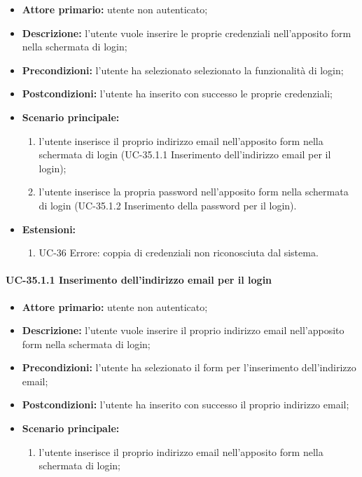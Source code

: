 	\begin{itemize}
		\item \textbf{Attore primario:} utente non autenticato;

		\item \textbf{Descrizione:} l'utente vuole inserire le proprie credenziali nell'apposito form nella schermata di login;

		\item \textbf{Precondizioni:} l'utente ha selezionato selezionato la funzionalità di login;

		\item \textbf{Postcondizioni:} l'utente ha inserito con successo le proprie credenziali;

		\item \textbf{Scenario principale:}
	  		\begin{enumerate}
		  		\item l'utente inserisce il proprio indirizzo email nell'apposito form nella schermata di login (UC-35.1.1 Inserimento dell'indirizzo email per il login); 
		  		\item l'utente inserisce la propria password nell'apposito form nella schermata di login (UC-35.1.2 Inserimento della password per il login).
	  		\end{enumerate}
	    \item \textbf{Estensioni:}
	  		\begin{enumerate}
		  		\item UC-36 Errore: coppia di credenziali non riconosciuta dal sistema.
	  		\end{enumerate}
	\end{itemize}


\paragraph{UC-35.1.1 Inserimento dell'indirizzo email per il login}

	\begin{itemize}
		\item \textbf{Attore primario:} utente non autenticato;

		\item \textbf{Descrizione:} l'utente vuole inserire il proprio indirizzo email nell'apposito form nella schermata di login;

		\item \textbf{Precondizioni:} l'utente ha selezionato il form per l'inserimento dell'indirizzo email;

		\item \textbf{Postcondizioni:} l'utente ha inserito con successo il proprio indirizzo email;

		\item \textbf{Scenario principale:}
	  		\begin{enumerate}
		  		\item l'utente inserisce il proprio indirizzo email nell'apposito form nella schermata di login; 
	  		\end{enumerate}
	\end{itemize}

